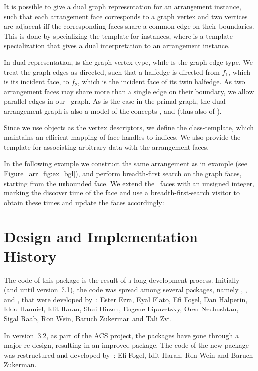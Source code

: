 It is possible to give a dual graph representation for an arrangement instance,
such that each arrangement face corresponds to a graph vertex and two vertices
are adjacent iff the corresponding faces share a common edge on their
boundaries. This is done by specializing the
 template for  instances,
where  is a template specialization that gives a
dual interpretation to an arrangement instance.

In dual representation, 
is the graph-vertex type, while  is the
graph-edge type. We treat the graph edges as directed, such that a halfedge
 is directed from $f_1$, which is its incident face, to $f_2$, which
is the incident face of its twin halfedge. As two arrangement faces may
share more than a single edge on their boundary, we allow parallel
edges in our \boost\ graph. As is the case in the primal graph, the dual
arrangement graph is also a model of the concepts ,
 and  (thus also of 
).

Since we use  objects as the vertex descriptors, we define
the  class-template, which maintains an
efficient mapping of face handles to indices. We also provide the template
 for associating arbitrary
data with the arrangement faces.

In the following example we construct the same arrangement as in
example  (see Figure~\ref{arr_fig:ex_bgl}),
and perform breadth-first search on the graph faces, starting from the
unbounded face. We extend the \dcel\ faces
with an unsigned integer, marking the discover time of the face and use a
breadth-first-search visitor to obtain these times and update the faces
accordingly:


\section*{Design and Implementation History}
%
The code of this package is the result of a long development process.
Initially (and until version~3.1), the code was spread among several
packages, namely , ,
 and , that were
developed by~: \newline
Ester Ezra, Eyal Flato, Efi Fogel, Dan Halperin, Iddo Hanniel, Idit Haran,
Shai Hirsch, Eugene Lipovetsky, Oren Nechushtan, Sigal Raab, Ron Wein,
Baruch Zukerman and Tali Zvi.

In version~3.2, as part of the ACS project, the packages have gone through
a major re-design, resulting in an improved  package.
The code of the new package was restructured and developed by~: \newline
Efi Fogel, Idit Haran, Ron Wein and Baruch Zukerman.
